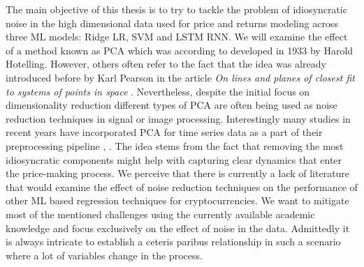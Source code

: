 The main objective of this thesis is to try to tackle the problem of idiosyncratic noise in
the high dimensional data used for price and returns modeling across three ML models: Ridge \ac{LR}, \ac{SVM}
and \ac{LSTM} \ac{RNN}.
We will examine the effect of a method known as \ac{PCA} which was according to 
\cite{Farebrother2022} developed in 1933 by Harold Hotelling. However, others often refer
to the fact 
that the idea was already introduced before by Karl Pearson in the article 
\textit{On lines and planes of closest fit to systems of points in space} \cite{Pearson1901}.
Nevertheless, despite the initial focus on dimensionality reduction different types of 
\ac{PCA} are often being used as noise reduction techniques in signal or image processing.
Interestingly many studies in recent years have incorporated \ac{PCA} for time series data 
as a part of their preprocessing pipeline \cite{Chowdhury2018}, \cite{Kristjanpoller2018}.
The idea stems from the fact that removing the most idiosyncratic components
might help with capturing clear dynamics that enter the price-making process.
We perceive that there is currently a lack of literature that would examine the effect of 
noise reduction techniques on the performance of other \ac{ML} based regression techniques
for cryptocurrencies. We want to mitigate most of the mentioned challenges using 
the currently available academic knowledge and focus exclusively on the effect of noise in the data. 
Admittedly it is always intricate to establish a ceteris paribus relationship in such a scenario
where a lot of variables change in the process. 





